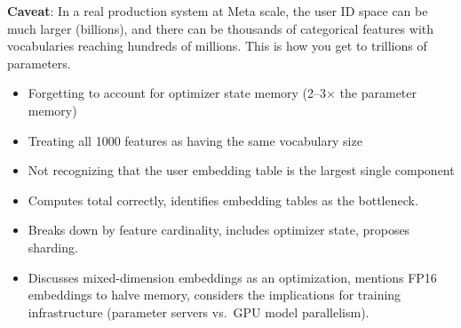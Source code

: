 \begin{interviewq}
\textbf{Caveat}: In a real production system at Meta scale, the user ID space can be much larger (billions), and there can be thousands of categorical features with vocabularies reaching hundreds of millions. This is how you get to trillions of parameters.

\redflags
\begin{itemize}
    \item Forgetting to account for optimizer state memory (2--3$\times$ the parameter memory)
    \item Treating all 1000 features as having the same vocabulary size
    \item Not recognizing that the user embedding table is the largest single component
\end{itemize}


\goodgreat
\begin{itemize}
    \item {} Computes total correctly, identifies embedding tables as the bottleneck.
    \item {} Breaks down by feature cardinality, includes optimizer state, proposes sharding.
    \item {} Discusses mixed-dimension embeddings as an optimization, mentions FP16 embeddings to halve memory, considers the implications for training infrastructure (parameter servers vs.\ GPU model parallelism).
\end{itemize}

\end{interviewq}

